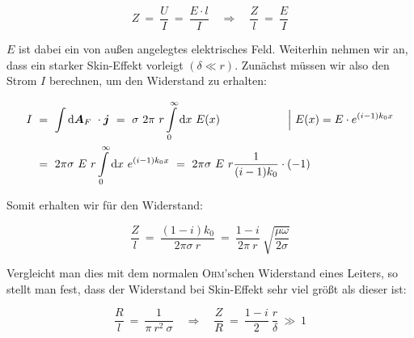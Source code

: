 \begin{equation*}
Z \ = \ \frac{U}{I} \ = \ \frac{E \cdot l}{I} \quad \Rightarrow \quad \frac{Z}{l} \ = \ \frac{E}{I}
\end{equation*}

$E$ ist dabei ein von außen angelegtes elektrisches Feld. Weiterhin nehmen wir an, dass ein starker Skin-Effekt vorleigt $(\delta\ll r)$. Zunächst müssen wir also den Strom $I$ berechnen, um den Widerstand zu erhalten:


\begin{align*}
I  \ &= \ \Int{}{}{\vec{A}_F}\cdot\vec{j} \ = \ \sigma \ 2 \pi \ r \Int{0}{\infty}{x} E(x) \qquad\qquad\qquad\Big| \ E(x) = E\cdot e^{(i-1)k_0 x}\\
&= \ 2\pi \sigma \ E \ r \Int{0}{\infty}{x}e^{(i-1)k_0 x}  \ = \ 2\pi\sigma \ E \ r  \frac{1}{(i-1)k_0}\cdot(-1) 
\end{align*}

Somit erhalten wir für den Widerstand:

\begin{equation*}
\frac{Z}{l}  \ = \ \frac{(1-i)k_0}{2\pi\sigma \ r} \ = \ \frac{1-i}{2\pi \ r}\ \sqrt{\frac{\mu\omega}{2\sigma}}
\end{equation*}

Vergleicht man dies mit dem normalen \textsc{Ohm}'schen Widerstand eines Leiters, so stellt man fest, dass der Widerstand bei Skin-Effekt sehr viel größt als dieser ist:

\begin{equation*}
\frac{R}{l} \ = \ \frac{1}{\pi \ r^2 \ \sigma} \quad \Rightarrow \quad \frac{Z}{R}  \ = \ \frac{1-i}{2} \ \frac{r}{\delta} \ \gg \ 1
\end{equation*}
